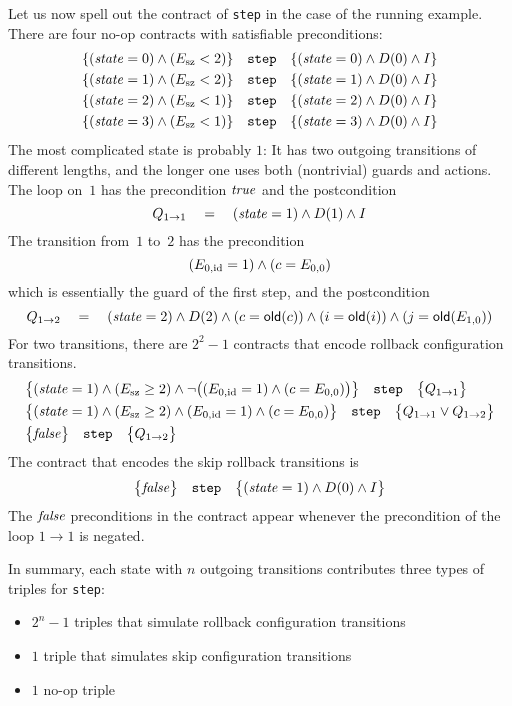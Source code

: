 \documentclass{article} %
\newcommand{\3}[3]{\{\,#1\,\}\;#2\;\{\,#3\,\}}
\renewcommand{\*}{\,*\,}
\begin{document}
Let us now spell out the contract of {\tt step} in the case of the running example.
There are four no-op contracts with satisfiable preconditions:
\begin{align*}
\{({\it state}=0)\land(E_{\rm sz}<2)\} \quad\text{\tt step}\quad
  \{({\it state}=0)\land D(0)\land I\} \\
\{({\it state}=1)\land(E_{\rm sz}<2)\} \quad\text{\tt step}\quad
  \{({\it state}=1)\land D(0)\land I\} \\
\{({\it state}=2)\land(E_{\rm sz}<1)\} \quad\text{\tt step}\quad
  \{({\it state}=2)\land D(0)\land I\} \\
\{({\it state}=3)\land(E_{\rm sz}<1)\} \quad\text{\tt step}\quad
  \{({\it state}=3)\land D(0)\land I\}
\end{align*}
The most complicated state is probably $1$:
It has two outgoing transitions of different lengths, and the longer one uses both (nontrivial) guards and actions.
The loop on~$1$ has the precondition ${\it true}$ and the postcondition
\[ Q_{1\to1} \quad=\quad ({\it state}=1) \land D(1) \land I \]
The transition from~$1$ to~$2$ has the precondition
\[ (E_{0,{\rm id}}=1)\land(c=E_{0,0}) \]
which is essentially the guard of the first step, and the postcondition
\[ Q_{1\to2} \quad=\quad
({\it state}=2)\land D(2)\land (c={\sf old}(c))\land (i={\sf old}(i))
  \land (j={\sf old}(E_{1,0}))\]
For two transitions, there are $2^2-1$ contracts that encode rollback configuration transitions.
\begin{align*}
&\bigl\{({\it state}=1)\land(E_{\rm sz}\ge2)\land
  \lnot\bigl((E_{0,{\rm id}}=1)\land(c=E_{0,0})\bigr)\bigr\}
  \quad\text{\tt step}\quad
  \bigl\{Q_{1\to1}\bigr\} \\
&\bigl\{({\it state}=1)\land(E_{\rm sz}\ge2)\land
  (E_{0,{\rm id}}=1)\land(c=E_{0,0})\bigr\}
  \quad\text{\tt step}\quad
  \bigl\{Q_{1\to1}\lor Q_{1\to2}\bigr\} \\
&\bigl\{{\it false}\bigr\}\quad\text{\tt step}\quad\bigl\{Q_{1\to2}\bigr\}
\end{align*}
The contract that encodes the skip rollback transitions is
\[ \bigl\{{\it false}\bigr\}\quad\text{\tt step}\quad
  \bigl\{({\it state}=1)\land D(0)\land I\bigr\} \]
The ${\it false}$ preconditions in the contract appear whenever the precondition of the loop $1\to1$ is negated.

In summary, each state with $n$ outgoing transitions contributes three types of triples for {\tt step}:
\begin{itemize}
\item $2^n-1$ triples that simulate rollback configuration transitions
\item $1$ triple that simulates skip configuration transitions
\item $1$ no-op triple
\end{itemize}
\end{document}
